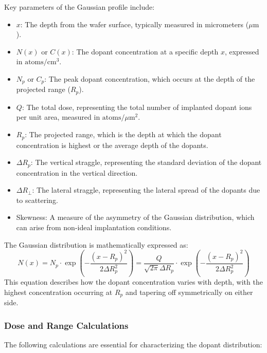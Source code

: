 \documentclass{report}
\begin{document}
Key parameters of the Gaussian profile include:
\begin{itemize}
    \item $x$: The depth from the wafer surface, typically measured in micrometers ($\mu\text{m}$).
    \item $N(x)$ or $C(x)$: The dopant concentration at a specific depth $x$, expressed in $\text{atoms}/\text{cm}^3$.
    \item $N_{p}$ or $C_{p}$: The peak dopant concentration, which occurs at the depth of the projected range ($R_{p}$).
    \item $Q$: The total dose, representing the total number of implanted dopant ions per unit area, measured in $\text{atoms}/\mu\text{m}^2$.
    \item $R_{p}$: The projected range, which is the depth at which the dopant concentration is highest or the average depth of the dopants.
    \item $\Delta R_{p}$: The vertical straggle, representing the standard deviation of the dopant concentration in the vertical direction.
    \item $\Delta R_{\perp}$: The lateral straggle, representing the lateral spread of the dopants due to scattering.
    \item Skewness: A measure of the asymmetry of the Gaussian distribution, which can arise from non-ideal implantation conditions.
\end{itemize}

The Gaussian distribution is mathematically expressed as:
$$
N(x) = N_{p} \cdot \exp\left(-\frac{(x - R_{p})^{2}}{2 \Delta R_{p}^{2}}\right)= \frac{Q}{\sqrt{2\pi} \Delta R_{p}} \cdot \exp\left(-\frac{(x - R_{p})^{2}}{2 \Delta R_{p}^{2}}\right)
$$
This equation describes how the dopant concentration varies with depth, with the highest concentration occurring at $R_{p}$ and tapering off symmetrically on either side.

\subsubsection{Dose and Range Calculations}
The following calculations are essential for characterizing the dopant distribution:
\end{document}
